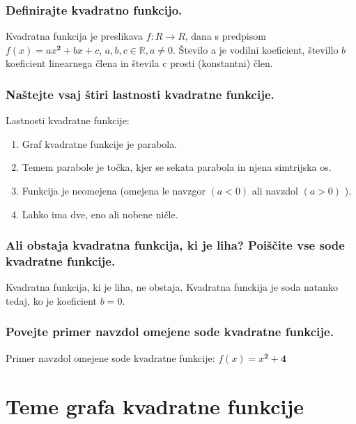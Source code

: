 \documentclass{article}
\begin{document}
\subsubsection*{Definirajte kvadratno funkcijo.}

Kvadratna funkcija je preslikava $f: R \rightarrow R$, dana s predpisom $f(x)=a x^{\mathbf{2}}+b x+c$, $a, b, c \in \mathbb{R}, a \neq 0$. Število a je vodilni koeficient, števillo $b$ koeficient linearnega člena in števila c prosti (konstantni) člen.

\subsubsection*{Naštejte vsaj štiri lastnosti kvadratne funkcije.}
Lastnosti kvadratne funkcije:
\begin{enumerate}
  \item Graf kvadratne funkcije je parabola.

  \item Temem parabole je točka, kjer se sekata parabola in njena simtrijska os.

  \item Funkcija je neomejena (omejena le navzgor $(a<0)$ ali navzdol $(a>0)$ ).

  \item Lahko ima dve, eno ali nobene ničle.

\end{enumerate}

\subsubsection*{Ali obstaja kvadratna funkcija, ki je liha? Poiščite vse sode kvadratne funkcije.}

Kvadratna funkcija, ki je liha, ne obstaja. Kvadratna funckija je soda natanko tedaj, ko je koeficient $b=0$.

\subsubsection*{Povejte primer navzdol omejene sode kvadratne funkcije.}

Primer navzdol omejene sode kvadratne funkcije: $f(x)=x^{\mathbf{2}}+\mathbf{4}$

\section{Teme grafa kvadratne funkcije}
\end{document}

